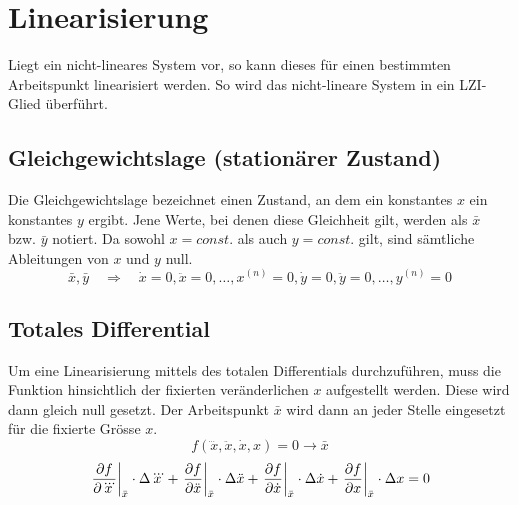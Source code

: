 \section{Linearisierung}
Liegt ein nicht-lineares System vor, so kann dieses für einen
bestimmten Arbeitspunkt linearisiert werden. So wird das
nicht-lineare System in ein LZI-Glied überführt.

\subsection{Gleichgewichtslage (stationärer Zustand)}
Die Gleichgewichtslage bezeichnet einen Zustand, an dem ein 
konstantes $x$ ein konstantes $y$ ergibt. Jene Werte, bei denen 
diese Gleichheit gilt, werden als $\bar{x}$ bzw. $\bar{y}$ 
notiert. Da sowohl $x=const.$ als auch $y=const.$ gilt, sind
sämtliche Ableitungen von $x$ und $y$ null.
\[  
    \bar{x}, \bar{y}
        \quad \Rightarrow \quad
        \dot{x} = 0,
        \ddot{x} = 0,    
        \dots,
        x^{(n)} = 0,
        \dot{y} = 0,
        \ddot{y} = 0,
        \dots,
        y^{(n)} = 0
\]

\subsection{Totales Differential}
Um eine Linearisierung mittels des totalen Differentials durchzuführen,
muss die Funktion hinsichtlich der fixierten veränderlichen $x$ 
aufgestellt werden. Diese wird dann gleich null gesetzt. 
Der Arbeitspunkt $\bar{x}$ wird dann an jeder Stelle eingesetzt für die 
fixierte Grösse $x$. 
\[ 
    f(\dddot{x}, \ddot{x}, \dot{x}, x) = 0 \rightarrow \bar{x}
\]
\[ 
    \begin{array}{r l} 
		\displaystyle 
            \left. \frac{\partial f}{\partial \dddot{x}}
                \right\rvert_{\bar{x}} \cdot \Delta \dddot{x}
            + \left.\frac{\partial f}{\partial \ddot{x}}
                \right\rvert_{\bar{x}} \cdot \Delta \ddot{x}
            + \left.\frac{\partial f}{\partial \dot{x}}
                \right\rvert_{\bar{x}} \cdot \Delta \dot{x}
            + \left.\frac{\partial f}{\partial x}
                \right\rvert_{\bar{x}} \cdot \Delta x 
            = 0\\
    \end{array} 
\]


